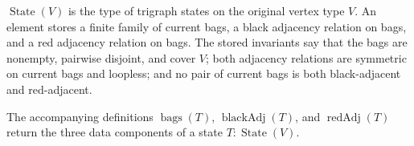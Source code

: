 \(\operatorname{State}(V)\) is the type of trigraph states on the original
vertex type \(V\).  An element stores a finite family of current bags, a black
adjacency relation on bags, and a red adjacency relation on bags.  The stored
invariants say that the bags are nonempty, pairwise disjoint, and cover \(V\);
both adjacency relations are symmetric on current bags and loopless; and no
pair of current bags is both black-adjacent and red-adjacent.

The accompanying definitions \(\operatorname{bags}(T)\),
\(\operatorname{blackAdj}(T)\), and \(\operatorname{redAdj}(T)\) return the
three data components of a state \(T:\operatorname{State}(V)\).
